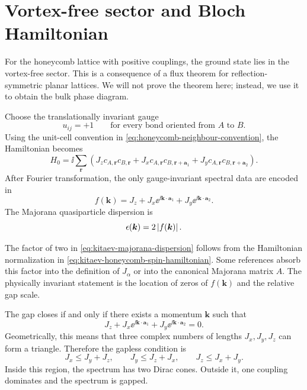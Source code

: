 \section{Vortex-free sector and Bloch Hamiltonian}
\label{sec:kitaev-vortex-free-bloch}

For the honeycomb lattice with positive couplings, the ground state lies in the
vortex-free sector.  This is a consequence of a flux theorem for reflection-
symmetric planar lattices.  We will not prove the theorem here; instead, we use
it to obtain the bulk phase diagram.

Choose the translationally invariant gauge
\begin{equation}
\label{eq:kitaev-vortex-free-gauge}
    u_{ij}=+1
    \qquad
    \text{for every bond oriented from }A\text{ to }B .
\end{equation}
Using the unit-cell convention in \cref{eq:honeycomb-neighbour-convention}, the
Hamiltonian becomes
\begin{equation}
\label{eq:kitaev-real-space-vortex-free}
    H_0
    =
    \ii\sum_{\bm r}
    \left(
    J_z c_{A,\bm r}c_{B,\bm r}
    +J_x c_{A,\bm r}c_{B,\bm r+\bm a_1}
    +J_y c_{A,\bm r}c_{B,\bm r+\bm a_2}
    \right).
\end{equation}
After Fourier transformation, the only gauge-invariant spectral data are encoded
in
\begin{equation}
\label{eq:kitaev-bloch-function}
    f(\bm k)
    =
    J_z+J_x\ee^{\ii \bm k\cdot\bm a_1}
       +J_y\ee^{\ii \bm k\cdot\bm a_2} .
\end{equation}
The Majorana quasiparticle dispersion is
\begin{equation}
\label{eq:kitaev-majorana-dispersion}
    \epsilon(\bm k)=2\left|f(\bm k)\right| .
\end{equation}

\begin{remark}
The factor of two in \cref{eq:kitaev-majorana-dispersion} follows from the
Hamiltonian normalization in \cref{eq:kitaev-honeycomb-spin-hamiltonian}.  Some
references absorb this factor into the definition of \(J_\alpha\) or into the
canonical Majorana matrix \(A\).  The physically invariant statement is the
location of zeros of \(f(\bm k)\) and the relative gap scale.
\end{remark}

The gap closes if and only if there exists a momentum \(\bm k\) such that
\begin{equation}
\label{eq:kitaev-gap-closing-condition-f}
    J_z+J_x\ee^{\ii \bm k\cdot\bm a_1}
       +J_y\ee^{\ii \bm k\cdot\bm a_2}=0 .
\end{equation}
Geometrically, this means that three complex numbers of lengths
\(J_x,J_y,J_z\) can form a triangle.  Therefore the gapless condition is
\begin{equation}
\label{eq:kitaev-triangle-inequalities}
    J_x\leq J_y+J_z,
    \qquad
    J_y\leq J_z+J_x,
    \qquad
    J_z\leq J_x+J_y .
\end{equation}
Inside this region, the spectrum has two Dirac cones.  Outside it, one coupling
dominates and the spectrum is gapped.

